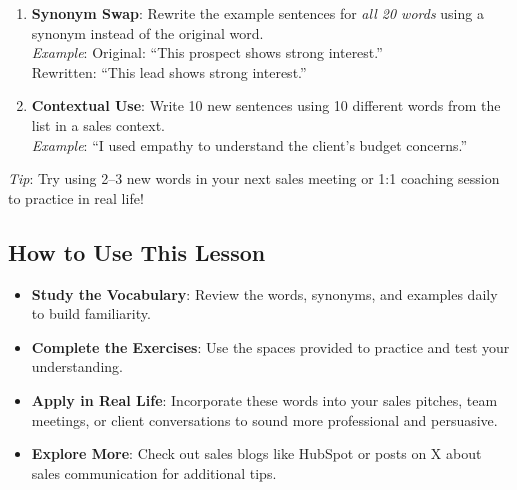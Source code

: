 \documentclass[11pt, a4paper]{article}
\begin{document}
\begin{enumerate}
    \item \textbf{Synonym Swap}: Rewrite the example sentences for \textit{all 20 words} using a synonym instead of the original word. \\
          \textit{Example}: Original: ``This prospect shows strong interest.'' \\
          Rewritten: ``This lead shows strong interest.''
    \item \textbf{Contextual Use}: Write 10 new sentences using 10 different words from the list in a sales context. \\
          \textit{Example}: ``I used empathy to understand the client’s budget concerns.''
\end{enumerate}

\textit{Tip}: Try using 2--3 new words in your next sales meeting or 1:1 coaching session to practice in real life!

\subsection{How to Use This Lesson}
\begin{itemize}
    \item \textbf{Study the Vocabulary}: Review the words, synonyms, and examples daily to build familiarity.
    \item \textbf{Complete the Exercises}: Use the spaces provided to practice and test your understanding.
    \item \textbf{Apply in Real Life}: Incorporate these words into your sales pitches, team meetings, or client conversations to sound more professional and persuasive.
    \item \textbf{Explore More}: Check out sales blogs like HubSpot or posts on X about sales communication for additional tips.
\end{itemize}
\end{document}
